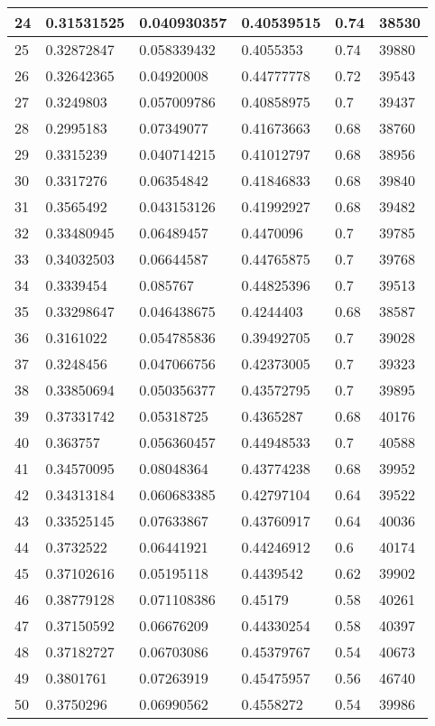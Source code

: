 \begin{longtable}{|l|l|l|l|l|l|}
24 & 0.31531525 & 0.040930357 & 0.40539515 & 0.74 & 38530 \\ \hline 
25 & 0.32872847 & 0.058339432 & 0.4055353 & 0.74 & 39880 \\ \hline 
26 & 0.32642365 & 0.04920008 & 0.44777778 & 0.72 & 39543 \\ \hline 
27 & 0.3249803 & 0.057009786 & 0.40858975 & 0.7 & 39437 \\ \hline 
28 & 0.2995183 & 0.07349077 & 0.41673663 & 0.68 & 38760 \\ \hline 
29 & 0.3315239 & 0.040714215 & 0.41012797 & 0.68 & 38956 \\ \hline 
30 & 0.3317276 & 0.06354842 & 0.41846833 & 0.68 & 39840 \\ \hline 
31 & 0.3565492 & 0.043153126 & 0.41992927 & 0.68 & 39482 \\ \hline 
32 & 0.33480945 & 0.06489457 & 0.4470096 & 0.7 & 39785 \\ \hline 
33 & 0.34032503 & 0.06644587 & 0.44765875 & 0.7 & 39768 \\ \hline 
34 & 0.3339454 & 0.085767 & 0.44825396 & 0.7 & 39513 \\ \hline 
35 & 0.33298647 & 0.046438675 & 0.4244403 & 0.68 & 38587 \\ \hline 
36 & 0.3161022 & 0.054785836 & 0.39492705 & 0.7 & 39028 \\ \hline 
37 & 0.3248456 & 0.047066756 & 0.42373005 & 0.7 & 39323 \\ \hline 
38 & 0.33850694 & 0.050356377 & 0.43572795 & 0.7 & 39895 \\ \hline 
39 & 0.37331742 & 0.05318725 & 0.4365287 & 0.68 & 40176 \\ \hline 
40 & 0.363757 & 0.056360457 & 0.44948533 & 0.7 & 40588 \\ \hline 
41 & 0.34570095 & 0.08048364 & 0.43774238 & 0.68 & 39952 \\ \hline 
42 & 0.34313184 & 0.060683385 & 0.42797104 & 0.64 & 39522 \\ \hline 
43 & 0.33525145 & 0.07633867 & 0.43760917 & 0.64 & 40036 \\ \hline 
44 & 0.3732522 & 0.06441921 & 0.44246912 & 0.6 & 40174 \\ \hline 
45 & 0.37102616 & 0.05195118 & 0.4439542 & 0.62 & 39902 \\ \hline 
46 & 0.38779128 & 0.071108386 & 0.45179 & 0.58 & 40261 \\ \hline 
47 & 0.37150592 & 0.06676209 & 0.44330254 & 0.58 & 40397 \\ \hline 
48 & 0.37182727 & 0.06703086 & 0.45379767 & 0.54 & 40673 \\ \hline 
49 & 0.3801761 & 0.07263919 & 0.45475957 & 0.56 & 46740 \\ \hline 
50 & 0.3750296 & 0.06990562 & 0.4558272 & 0.54 & 39986 \\ \hline 
\end{longtable}